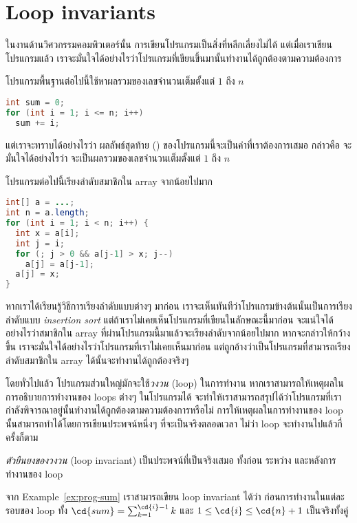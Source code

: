 \section{Loop invariants}
ในงานด้านวิศวกรรมคอมพิวเตอร์นั้น การเขียนโปรแกรมเป็นสิ่งที่หลีกเลี่ยงไม่ได้ \enskip แต่เมื่อเราเขียนโปรแกรมแล้ว เราจะมั่นใจได้อย่างไรว่าโปรแกรมที่เขียนขึ้นมานั้นทำงานได้ถูกต้องตามความต้องการ

\begin{example}\label{ex:prog-sum}
โปรแกรมพื้นฐานต่อไปนี้ใช้หาผลรวมของเลขจำนวนเต็มตั้งแต่ $1$ ถึง $n$
\begin{lstlisting}[language=java]
int sum = 0;
for (int i = 1; i <= n; i++)
  sum += i;
\end{lstlisting}
แต่เราจะทราบได้อย่างไรว่า ผลลัพธ์สุดท้าย () ของโปรแกรมนี้จะเป็นค่าที่เราต้องการเสมอ กล่าวคือ จะมั่นใจได้อย่างไรว่า  จะเป็นผลรวมของเลขจำนวนเต็มตั้งแต่ $1$ ถึง $n$
\end{example}

\begin{example}\label{ex:prog-insertion-sort}
โปรแกรมต่อไปนี้เรียงลำดับสมาชิกใน array จากน้อยไปมาก
\begin{lstlisting}[language=java]
int[] a = ...;
int n = a.length;
for (int i = 1; i < n; i++) {
  int x = a[i];
  int j = i;
  for (; j > 0 && a[j-1] > x; j--)
    a[j] = a[j-1];
  a[j] = x;
}
\end{lstlisting}
หากเราได้เรียนรู้วิธีการเรียงลำดับแบบต่างๆ มาก่อน เราจะเห็นทันทีว่าโปรแกรมข้างต้นนั้นเป็นการเรียงลำดับแบบ \emph{insertion sort} \enskip แต่ถ้าเราไม่เคยเห็นโปรแกรมที่เขียนในลักษณะนี้มาก่อน จะแน่ใจได้อย่างไรว่าสมาชิกใน array ที่ผ่านโปรแกรมนี้มาแล้วจะเรียงลำดับจากน้อยไปมาก \enskip หากจะกล่าวให้กว้างขึ้น เราจะมั่นใจได้อย่างไรว่าโปรแกรมที่เราไม่เคยเห็นมาก่อน แต่ถูกอ้างว่าเป็นโปรแกรมที่สามารถเรียงลำดับสมาชิกใน array ได้นั้นจะทำงานได้ถูกต้องจริงๆ
\end{example}

โดยทั่วไปแล้ว โปรแกรมส่วนใหญ่มักจะใช้\emph{วงวน} (loop) ในการทำงาน \enskip หากเราสามารถให้เหตุผลในการอธิบายการทำงานของ loops ต่างๆ ในโปรแกรมได้ จะทำให้เราสามารถสรุปได้ว่าโปรแกรมที่เรากำลังพิจารณาอยู่นั้นทำงานได้ถูกต้องตามความต้องการหรือไม่ \enskip การให้เหตุผลในการทำงานของ loop นั้นสามารถทำได้โดยการเขียนประพจน์หนึ่งๆ ที่จะเป็นจริงตลอดเวลา ไม่ว่า loop จะทำงานไปแล้วกี่ครั้งก็ตาม

\begin{definition}
\emph{ตัวยืนยงของวงวน} (loop invariant) เป็นประพจน์ที่เป็นจริงเสมอ ทั้งก่อน ระหว่าง และหลังการทำงานของ loop
\end{definition}
%
\begin{example}\label{ex:prog-sum-inv}
จาก Example~\ref{ex:prog-sum} เราสามารถเขียน loop invariant ได้ว่า ก่อนการทำงานในแต่ละรอบของ loop ทั้ง $\cd{sum}=\sum_{k=1}^{\cd{i}-1}{k}$ และ $1\leq\cd{i}\leq\cd{n}+1$ เป็นจริงทั้งคู่
\end{example}

